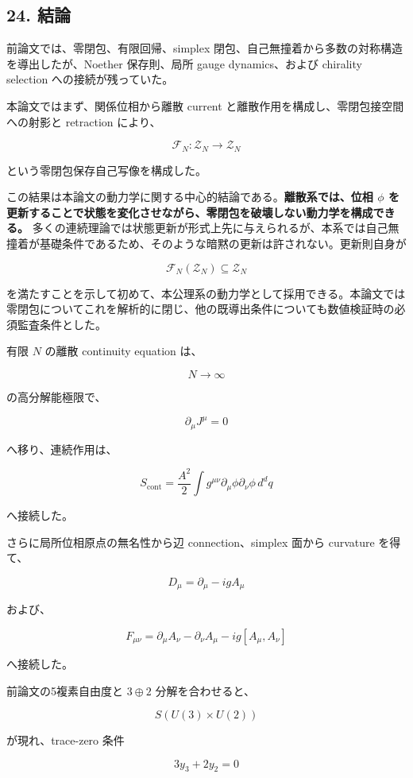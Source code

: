\documentclass[
  a4paper,
]{ltjsarticle}
\begin{document}
\subsection{24. 結論}\label{ux7d50ux8ad6}

前論文では、零閉包、有限回帰、simplex
閉包、自己無撞着から多数の対称構造を導出したが、Noether 保存則、局所
gauge dynamics、および chirality selection への接続が残っていた。

本論文ではまず、関係位相から離散 current
と離散作用を構成し、零閉包接空間への射影と retraction により、

\[
\mathcal F_N:
\mathcal Z_N\to\mathcal Z_N
\]

という零閉包保存自己写像を構成した。

この結果は本論文の動力学に関する中心的結論である。\textbf{離散系では、位相
\(\phi\)
を更新することで状態を変化させながら、零閉包を破壊しない動力学を構成できる。}
多くの連続理論では状態更新が形式上先に与えられるが、本系では自己無撞着が基礎条件であるため、そのような暗黙の更新は許されない。更新則自身が

\[
\boxed{
\mathcal F_N(\mathcal Z_N)\subseteq\mathcal Z_N
}
\]

を満たすことを示して初めて、本公理系の動力学として採用できる。本論文では零閉包についてこれを解析的に閉じ、他の既導出条件についても数値検証時の必須監査条件とした。

有限 \(N\) の離散 continuity equation は、

\[
N\to\infty
\]

の高分解能極限で、

\[
\partial_\mu J^\mu=0
\]

へ移り、連続作用は、

\[
S_{\mathrm{cont}}
=
\frac{A^2}{2}
\int
g^{\mu\nu}
\partial_\mu\phi
\partial_\nu\phi
\,d^dq
\]

へ接続した。

さらに局所位相原点の無名性から辺 connection、simplex 面から curvature
を得て、

\[
D_\mu
=
\partial_\mu-igA_\mu
\]

および、

\[
F_{\mu\nu}
=
\partial_\mu A_\nu-\partial_\nu A_\mu-ig[A_\mu,A_\nu]
\]

へ接続した。

前論文の5複素自由度と \(3\oplus2\) 分解を合わせると、

\[
S(U(3)\times U(2))
\]

が現れ、trace-zero 条件

\[
3y_3+2y_2=0
\]
\end{document}
